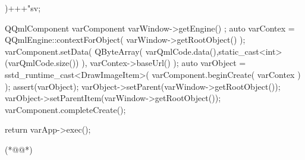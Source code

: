 \begin{thebookfilesourceone}[escapeinside={(*@}{@*)},
caption=GoodLuck,
title=\filesourcenumbernameone \thefilesourcenumber
]
{{{}

)+++"sv;

        QQmlComponent varComponent{ varWindow->getEngine() };
        auto varContex = QQmlEngine::contextForObject( varWindow->getRootObject() );
        varComponent.setData(
            QByteArray( varQmlCode.data(),static_cast<int>(varQmlCode.size()) ),
            varContex->baseUrl()
        );
        auto varObject = sstd_runtime_cast<DrawImageItem>(
            varComponent.beginCreate( varContex ) );
        assert(varObject);
        varObject->setParent(varWindow->getRootObject());
        varObject->setParentItem(varWindow->getRootObject());
        varComponent.completeCreate();

    }

    return varApp->exec();

}(*@\marginpar[\hfill\setlength\fboxsep{2pt}\fbox{\footnotesize{\kaishu\parbox{1em}{\setlength{\baselineskip}{2pt}\filesourcenumbernameone}}\footnotesize{\thefilesourcenumber}}]{\setlength\fboxsep{2pt}\fbox{\footnotesize{\kaishu\parbox{1em}{\setlength{\baselineskip}{2pt}\filesourcenumbernameone}}\footnotesize{\thefilesourcenumber}}}@*)\end{thebookfilesourceone}          %
\addtocounter{lstlisting}{-1}   %


